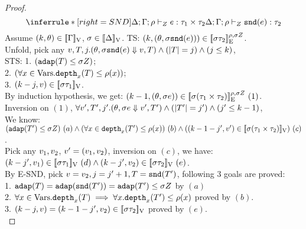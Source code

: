 \documentclass[a4paper,11pt]{article}
\theoremstyle{definition}
\begin{document}
\begin{proof}
\[
    \inferrule*[right = SND]{
      \Delta; \Gamma; \dmap \tvdash{\nnatA} \expr: \type_1 \times \type_2
    }{
      \Delta; \Gamma; \dmap \tvdash{\nnatA} \eprojr(\expr): \type_2
    }
\]
Assume $(k, \theta) \in [\![ \Gamma ]\!]_{\text{V}}$, $ \sigma \in [\![ \Delta ]\!]_{\text{V}}$. TS: $(k, (\theta, \sigma \mathtt{snd}(e))) \in [\![ \sigma \tau_2 ]\!]_{\text{E}}^{\rho, \sigma Z} $.\\
%
Unfold, pick any $ v, T, j. (\theta, \sigma \mathtt{snd}(e) \mathrel{\Downarrow} v, T) \land (|T| = j) \land (j \leq k) $,\\
%
STS: 
1. $ (\mathtt{adap}(T) \leq \sigma Z)$;\\
%
2. $(\forall x \in \mbox{Vars}. \mathtt{depth}_{x}(T) \leq \rho(x))$;\\
%
3. $(k - j, v) \in [\![ \sigma \tau_1 ]\!]_{\text{V}} $.\\
%
By induction hypothesis, we get: $(k-1, (\theta, \sigma e)) \in [\![ \sigma (\tau_1 \times \tau_2) ]\!]_{\text{E}}^{\rho, \sigma Z} ~(1)$.\\
%
Inversion on $(1)$, $\forall v', T', j'. (\theta, \sigma e \mathrel{\Downarrow} v', T') \land (|T'| = j') \land (j' \leq k-1) $,\\
%
We know: $(\adap(\tr') \leq \ienv \nnatA) ~ (a) 
%
\land (\forall x \in \ddep{x}(\tr') \leq \dmap(x)) ~ (b)
%
\land ((\stepiA -1- j', \valr') \in \lrv{\ienv (\type_1 \times \type_2)}) ~ (c)$.\\
%
Pick any $v_1, v_2$, $v' = (v_1, v_2)$,
%
inversion on $(c)$, we have:\\
%
$(k - j', v_1) \in [\![ \sigma \tau_1 ]\!]_{\text{V}}~(d) \land (k - j', v_2) \in [\![ \sigma \tau_2 ]\!]_{\text{V}}~(e)$.\\
%
By E-SND, pick $v = v_2, j = j'+1, T = \mathtt{snd}(T')$, following 3 goals are proved:\\
%
1. $\mathtt{adap}(T) = \mathtt{adap}(\mathtt{snd}(T')) = \mathtt{adap}(T') \leq \sigma Z$ by $(a)$\\
%
2. $\forall x \in \mbox{Vars} .\mathtt{depth}_{x}(T) \implies \forall x . \mathtt{depth}_{x}(T') \leq
\rho(x)$ proved by $(b)$.\\
%
3. $(k - j, v) = (k -1 - j', v_2) \in [\![ \sigma \tau_2 ]\!]_{\text{V}}$
proved by $(e)$.\\



\end{proof}
\end{document}
